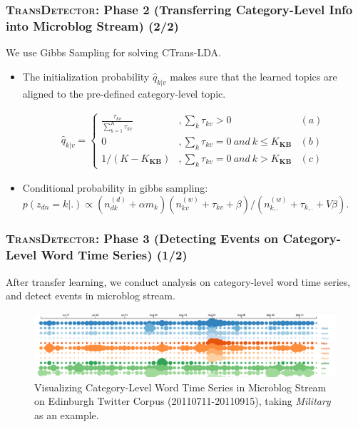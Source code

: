 \documentclass{beamer}
\begin{document}
\begin{frame}
\frametitle{\textsc{TransDetector}: Phase 2 (Transferring Category-Level Info into Microblog Stream) (2/2)}	
We use Gibbs Sampling for solving CTrans-LDA.
\begin{itemize}
	\item The initialization probability \(\hat{q}_{k|v}\) makes sure that the learned topics are aligned to the pre-defined category-level topic.
\setlength{\abovedisplayskip}{0pt}
\setlength{\belowdisplayskip}{0pt}
\begin{scriptsize} 
\begin{equation}
\label{eq:initProbability}
\begin{aligned}
\hat{q}_{k|v}=
\left\{ \begin{aligned}
\frac{\tau_{kv}}{\sum_{k=1}^{K}\tau_{kv}} &,\sum_{k}\tau_{kv}>0 & (a)\\
0&, \sum_{k}\tau_{kv}=0 \ and \ k \leq K_{\bm{KB}} & (b)\\
1/(K-K_{\bm{KB}})&,\sum_{k}\tau_{kv}=0 \ and \ k > K_{\bm{KB}} & (c)
\end{aligned}\right.
\end{aligned}
\end{equation}
\end{scriptsize}
\item Conditional probability in gibbs sampling:
\(p(z_{dn}=k|.)\propto (n^{(d)}_{dk}+\alpha m_k)(n^{(w)}_{kv}+\tau_{kv}+\beta)/(n^{(w)}_{k,.}+\tau_{k,.}+V\beta)\).
\end{itemize}

\end{frame}


\begin{frame}
\frametitle{\textsc{TransDetector}: Phase 3 (Detecting Events on Category-Level Word Time Series) (1/2)}	
After transfer learning, we conduct analysis on category-level word time series, and detect events in microblog stream.
\begin{figure}[h]
		\setlength{\abovecaptionskip}{0.cm}
        \setlength{\belowcaptionskip}{0.cm}
        \centering
        \includegraphics[width=.99\columnwidth]{../img/screenShot.png}
        \caption{Visualizing Category-Level Word Time Series in Microblog Stream on Edinburgh Twitter Corpus (20110711-20110915), taking \textit{Military} as an example.}
        \label{fig:hood}
\end{figure}
\end{frame}
\end{document}
